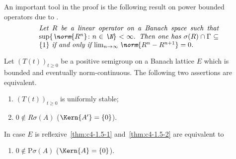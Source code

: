 An important tool in the proof is the following result on power bounded operators due to \textcite{katznelsontzafriri:1984}.
\begin{equation}\label{eq:c4-1.4}
\begin{minipage}{.75\linewidth}
\textit{Let $R$ be a linear operator on a Banach space such that $\sup\{ \norm{R^{n}} \colon n \in \N \} < \infty$. 
Then one has $\sigma(R) \cap \Gamma \subseteq \{1\}$ if and only if 
$ \lim_{n \to \infty} \norm{R^{n} - R^{n+1}} = 0$.}
\end{minipage}
\end{equation}
\begin{theorem}\label{thm:c4-1.5}%
Let $(T(t))_{t\geq 0}$ be a positive semigroup on a Banach lattice $E$ which is bounded and eventually norm-continuous.
The following two assertions are equivalent.
\begin{enumerate}[\upshape (a)]
    \item \label{thm:c4-1.5-1}
    $(T(t))_{t\geq 0}$ is uniformly stable;
    
    \item \label{thm:c4-1.5-2}
    $0 \notin R\sigma(A)$ (\ie  $\Kern{A'} 
    = \{0\}$).
\end{enumerate}
In case $E$ is reflexive~\ref{thm:c4-1.5-1} and~\ref{thm:c4-1.5-2} are equivalent to
\begin{enumerate}

\item  \label{thm:c4-1.5-3}
$0 \notin \text{P}\sigma(A)$ (\ie  $\Kern{A} = \{0\}$).
\end{enumerate}
\end{theorem}
